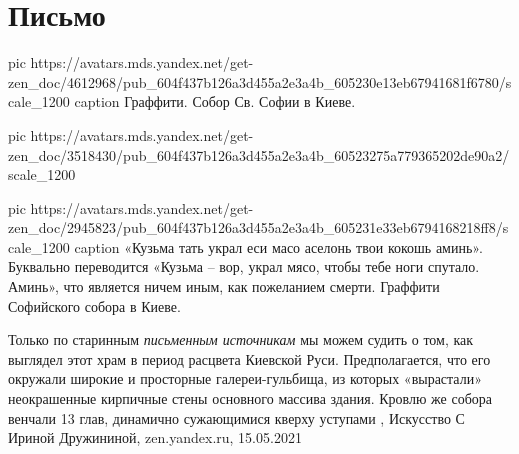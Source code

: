  
 
 
 
 
\chapter{Письмо}
\label{sec:slova.pismo}

\ifcmt
  pic https://avatars.mds.yandex.net/get-zen_doc/4612968/pub_604f437b126a3d455a2e3a4b_605230e13eb67941681f6780/scale_1200
	caption Граффити. Собор Св. Софии в Киеве.

	pic https://avatars.mds.yandex.net/get-zen_doc/3518430/pub_604f437b126a3d455a2e3a4b_60523275a779365202de90a2/scale_1200

	pic https://avatars.mds.yandex.net/get-zen_doc/2945823/pub_604f437b126a3d455a2e3a4b_605231e33eb6794168218ff8/scale_1200
	caption «Кузьма тать украл еси масо аселонь твои кокошь аминь». Буквально переводится «Кузьма – вор, украл мясо, чтобы тебе ноги спутало. Аминь», что является ничем иным, как пожеланием смерти. Граффити Софийского собора в Киеве.

\fi
Только по старинным \emph{письменным источникам} мы можем судить о том, как выглядел
этот храм в период расцвета Киевской Руси. Предполагается, что его окружали
широкие и просторные галереи-гульбища, из которых «вырастали» неокрашенные
кирпичные стены основного массива здания. Кровлю же собора венчали 13 глав,
динамично сужающимися кверху уступами
, 
Искусство С Ириной Дружининой, zen.yandex.ru, 15.05.2021
